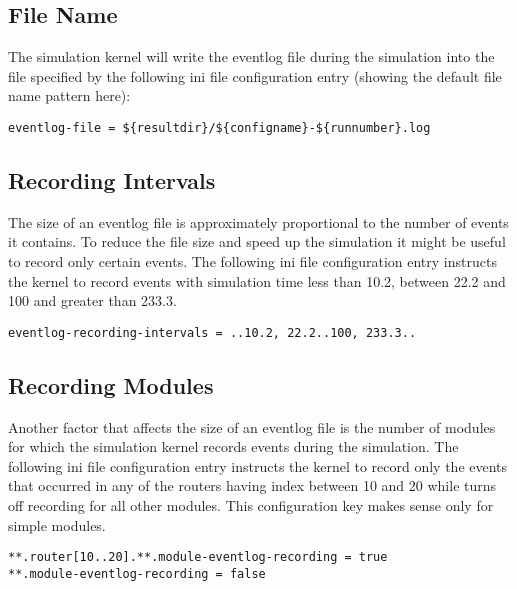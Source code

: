 \subsection{File Name}
The simulation kernel will write the eventlog file during the simulation into the file
specified by the following ini file configuration entry (showing the default file name
pattern here):
\begin{verbatim}
eventlog-file = ${resultdir}/${configname}-${runnumber}.log
\end{verbatim}

\subsection{Recording Intervals}
The size of an eventlog file is approximately proportional to the number of events it
contains. To reduce the file size and speed up the simulation it might be useful to record
only certain events. The following ini file configuration entry instructs the kernel to
record events with simulation time less than 10.2, between 22.2 and 100 and greater than
233.3.
\begin{verbatim}
eventlog-recording-intervals = ..10.2, 22.2..100, 233.3..
\end{verbatim}

\subsection{Recording Modules}
Another factor that affects the size of an eventlog file is the number of modules for
which the simulation kernel records events during the simulation. The following ini file
configuration entry instructs the kernel to record only the events that occurred in any of
the routers having index between 10 and 20 while turns off recording for all other
modules. This configuration key makes sense only for simple modules.
\begin{verbatim}
**.router[10..20].**.module-eventlog-recording = true
**.module-eventlog-recording = false
\end{verbatim}

